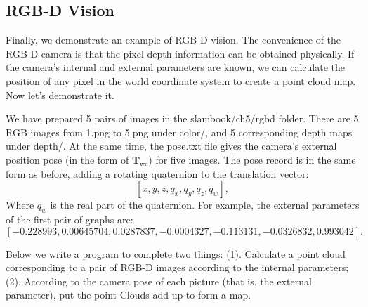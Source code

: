 \subsection{RGB-D Vision}

\label{sec:join-point-cloud}

Finally, we demonstrate an example of RGB-D vision. The convenience of the RGB-D camera is that the pixel depth information can be obtained physically. If the camera's internal and external parameters are known, we can calculate the position of any pixel in the world coordinate system to create a point cloud map. Now let's demonstrate it.

We have prepared 5 pairs of images in the slambook/ch5/rgbd folder. There are 5 RGB images from 1.png to 5.png under color/, and 5 corresponding depth maps under depth/. At the same time, the pose.txt file gives the camera's external position pose (in the form of $\bm{T}_\mathrm{wc}$) for five images. The pose record is in the same form as before, adding a rotating quaternion to the translation vector:
\[
[x,y,z,q_x,q_y,q_z,q_w],
\]
Where $q_w$ is the real part of the quaternion. For example, the external parameters of the first pair of graphs are:
\[
[-0.228993, 0.00645704, 0.0287837, -0.0004327, -0.113131, -0.0326832, 0.993042].
\]

Below we write a program to complete two things: (1). Calculate a point cloud corresponding to a pair of RGB-D images according to the internal parameters; (2). According to the camera pose of each picture (that is, the external parameter), put the point Clouds add up to form a map.

